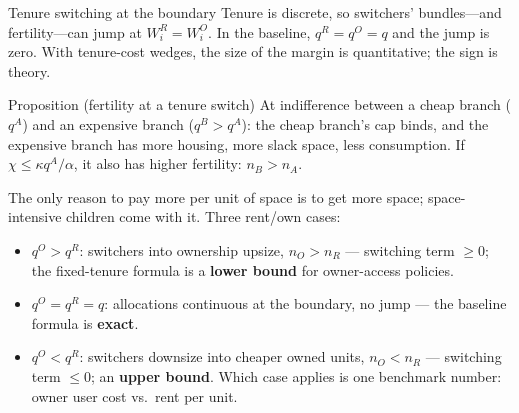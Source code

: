 \documentclass[11pt,aspectratio=169]{beamer}
\newcommand{\1}{\mathbf 1}
\begin{document}
\begin{frame}{Tenure switching at the boundary}
\small
Tenure is discrete, so switchers' bundles---and fertility---can jump at $W_i^R=W_i^O$. In the baseline, $q^R=q^O=q$ and the jump is zero. With tenure-cost wedges, the size of the margin is quantitative; the sign is theory.

\begin{block}{Proposition (fertility at a tenure switch)}
At indifference between a cheap branch ($q^A$) and an expensive branch ($q^B>q^A$): the cheap branch's cap binds, and the expensive branch has more housing, more slack space, less consumption. If $\chi\le\kappa q^A/\alpha$, it also has higher fertility: $n_B>n_A$.
\end{block}
The only reason to pay more per unit of space is to get more space; space-intensive children come with it. Three rent/own cases:
\begin{itemize}\setlength{\itemsep}{0.3em}
  \item $q^O>q^R$: switchers into ownership upsize, $n_O>n_R$ --- switching term $\ge0$; the fixed-tenure formula is a \textbf{lower bound} for owner-access policies.
  \item $q^O=q^R=q$: allocations continuous at the boundary, no jump --- the baseline formula is \textbf{exact}.
  \item $q^O<q^R$: switchers downsize into cheaper owned units, $n_O<n_R$ --- switching term $\le0$; an \textbf{upper bound}. Which case applies is one benchmark number: owner user cost vs.\ rent per unit.
\end{itemize}
\end{frame}
\end{document}

